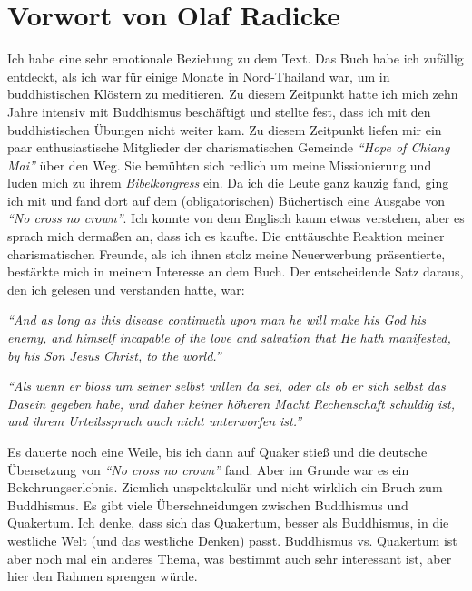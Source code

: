 \part{Vorwort von Olaf Radicke}


Ich habe eine sehr emotionale Beziehung zu dem Text. Das Buch habe ich zufällig
entdeckt, als ich war für einige Monate in Nord-Thailand war, um in buddhistischen
Klöstern zu meditieren. Zu diesem Zeitpunkt hatte ich mich zehn Jahre intensiv mit
Buddhismus beschäftigt und stellte fest, dass ich mit den buddhistischen Übungen
nicht weiter kam. Zu diesem Zeitpunkt liefen mir ein paar enthusiastische
Mitglieder der charismatischen Gemeinde \textit{"`Hope of Chiang Mai"'} über
den Weg. Sie bemühten sich redlich um meine Missionierung und luden mich zu
ihrem \textit{Bibelkongress} ein. Da ich die Leute ganz kauzig fand, ging ich
mit und fand dort auf dem (obligatorischen) Büchertisch eine Ausgabe
von \textit{"`No cross no crown"'}.
Ich konnte von dem Englisch kaum etwas verstehen, aber es sprach mich dermaßen
an, dass ich es kaufte. Die enttäuschte Reaktion meiner charismatischen Freunde,
als ich ihnen stolz meine Neuerwerbung präsentierte, bestärkte mich in meinem
Interesse an dem Buch. Der entscheidende Satz daraus, den ich gelesen und
verstanden hatte, war:

\begin{center}
\parbox{7,5cm}{
\textit{"`And as long as this disease continueth upon man he will make his God
his enemy, and himself incapable of the love and salvation that He hath
manifested, by his Son Jesus Christ, to the world."'}

\medskip

\textit{"`Als wenn er bloss um seiner selbst willen da sei, oder als ob er
sich selbst das Dasein gegeben habe, und daher keiner höheren Macht Rechenschaft
schuldig ist, und ihrem Urteilsspruch auch nicht unterworfen ist."'}
}
\end{center}

\medskip

Es dauerte noch eine Weile, bis ich dann auf Quaker stieß und die deutsche
Übersetzung von \textit{"`No cross no crown"'} fand. Aber im Grunde war es ein
Bekehrungserlebnis. Ziemlich unspektakulär und nicht wirklich ein Bruch zum
Buddhismus. Es gibt viele Überschneidungen zwischen Buddhismus und Quakertum.
Ich denke, dass sich das Quakertum, besser als Buddhismus, in die westliche Welt (und das westliche
Denken) passt. Buddhismus vs. Quakertum ist aber noch mal
ein anderes Thema, was bestimmt auch sehr interessant ist, aber hier den Rahmen
sprengen würde.

